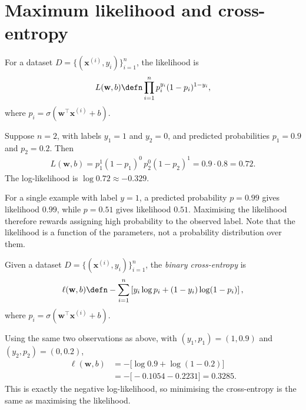 \documentclass[a4paper, 12pt]{book}
\begin{document}
\section{Maximum likelihood and cross-entropy}

\begin{definition}
    For a dataset $D = \{(\mathbf{x}^{(i)},y_i)\}_{i=1}^n$, the likelihood is
    \begin{align}
        L(\mathbf{w},b) \defn \prod_{i=1}^n p_i^{y_i}(1-p_i)^{1-y_i},
    \end{align}
    where $p_i = \sigma(\mathbf{w}^\top\mathbf{x}^{(i)}+b)$.
\end{definition}

\begin{example}
    Suppose $n=2$, with labels $y_1=1$ and $y_2=0$, and predicted probabilities
    $p_1=0.9$ and $p_2=0.2$. Then
    \begin{align}
        L(\mathbf{w},b)
        = p_1^{1}(1-p_1)^{0}\,p_2^{0}(1-p_2)^{1}
        = 0.9 \cdot 0.8 = 0.72.
    \end{align}
    The log-likelihood is $\log 0.72 \approx -0.329$.
\end{example}

\begin{example}
    For a single example with label $y=1$, a predicted probability $p=0.99$
    gives likelihood $0.99$, while $p=0.51$ gives likelihood $0.51$. Maximising
    the likelihood therefore rewards assigning high probability to the observed
    label. Note that the likelihood is a function of the parameters, not a
    probability distribution over them.
\end{example}

\begin{definition}
    Given a dataset $D = \{(\mathbf{x}^{(i)},y_i)\}_{i=1}^n$, the \emph{binary cross-entropy} is
    \begin{align}
        \ell(\mathbf{w},b) \defn -\sum_{i=1}^n \left[ y_i \log p_i + (1-y_i)\log(1-p_i) \right],
    \end{align}
    where $p_i = \sigma(\mathbf{w}^\top\mathbf{x}^{(i)}+b)$.
\end{definition}

\begin{example}
    Using the same two observations as above, with $(y_1,p_1)=(1,0.9)$ and
    $(y_2,p_2)=(0,0.2)$,
    \begin{align}
        \ell(\mathbf{w},b)
        &= -\big[\log 0.9 + \log(1-0.2)\big] \\
        &= -\big[-0.1054 - 0.2231\big]
        = 0.3285.
    \end{align}
    This is exactly the negative log-likelihood, so minimising the cross-entropy
    is the same as maximising the likelihood.
\end{example}
\end{document}
